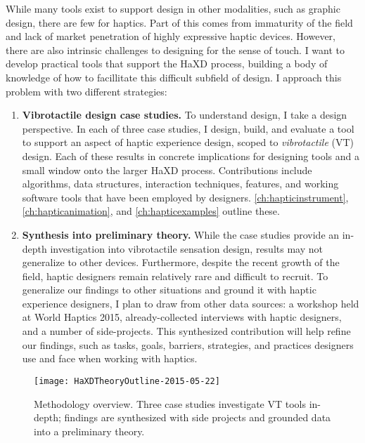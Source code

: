 While many tools exist to support design in other modalities, such as graphic design, there are few for haptics.
Part of this comes from immaturity of the field and lack of market penetration of highly expressive haptic devices.
However, there are also intrinsic challenges to designing for the sense of touch.
I want to develop practical tools that support the HaXD process, building a body of knowledge of how to facillitate this difficult subfield of design.
I approach this problem with two different strategies:
\begin{enumerate}
\item \textbf{Vibrotactile design case studies.}
To understand design, I take a design perspective.
In each of three case studies, I design, build, and evaluate a tool to support an aspect of haptic experience design, scoped to \emph{vibrotactile} (VT) design.
Each of these results in concrete implications for designing tools and a small window onto the larger HaXD process.
Contributions include algorithms, data structures, interaction techniques, features, and working software tools that have been employed by designers.
\autoref{ch:hapticinstrument}, \autoref{ch:hapticanimation}, and \autoref{ch:hapticexamples} outline these.

\item \textbf{Synthesis into preliminary theory.}
While the case studies provide an in-depth investigation into vibrotactile sensation design, results may not generalize to other devices.
Furthermore, despite the recent growth of the field, haptic designers remain relatively rare and difficult to recruit.
To generalize our findings to other situations and ground it with haptic experience designers, I plan to draw from other data sources: a workshop held at World Haptics 2015, already-collected interviews with haptic designers, and a number of side-projects.
This synthesized contribution will help refine our findings, such as tasks, goals, barriers, strategies, and practices designers use and face when working with haptics.
\end{enumerate}


\begin{figure}[htbp]
\begin{center}
\texttt{[image: HaXDTheoryOutline-2015-05-22]}
\caption{Methodology overview. Three case studies investigate VT tools in-depth; findings are synthesized with side projects and grounded data into a preliminary theory.}
\label{fig:intro:methodologyoverview}
\end{center}
\end{figure}


